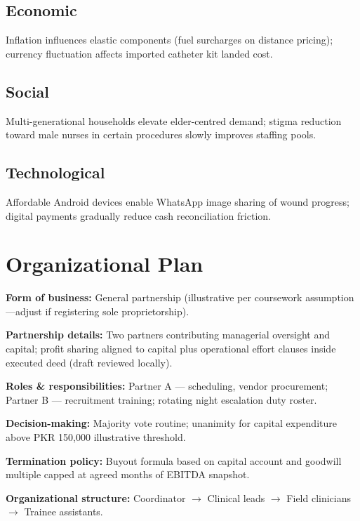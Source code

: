 \documentclass[12pt,a4paper]{report}
\begin{document}
\section{Economic}
Inflation influences elastic components (fuel surcharges on distance pricing); currency fluctuation affects imported catheter kit landed cost.

\section{Social}
Multi-generational households elevate elder-centred demand; stigma reduction toward male nurses in certain procedures slowly improves staffing pools.

\section{Technological}
Affordable Android devices enable WhatsApp image sharing of wound progress; digital payments gradually reduce cash reconciliation friction.

\chapter{Organizational Plan}

\textbf{Form of business:} General partnership (illustrative per coursework assumption---adjust if registering sole proprietorship).

\textbf{Partnership details:} Two partners contributing managerial oversight and capital; profit sharing aligned to capital plus operational effort clauses inside executed deed (draft reviewed locally).

\textbf{Roles \& responsibilities:} Partner A --- scheduling, vendor procurement; Partner B --- recruitment training; rotating night escalation duty roster.

\textbf{Decision-making:} Majority vote routine; unanimity for capital expenditure above PKR 150{,}000 illustrative threshold.

\textbf{Termination policy:} Buyout formula based on capital account and goodwill multiple capped at agreed months of EBITDA snapshot.

\textbf{Organizational structure:} Coordinator $\rightarrow$ Clinical leads $\rightarrow$ Field clinicians $\rightarrow$ Trainee assistants.

\begin{center}
\end{center}
\end{document}
